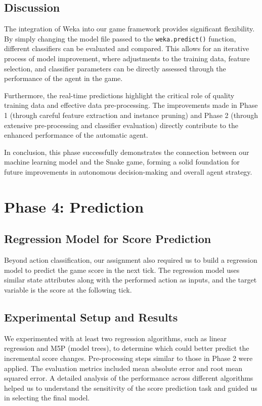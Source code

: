 \documentclass[12pt,a4paper]{article}
\begin{document}
\subsection{Discussion}

The integration of Weka into our game framework provides significant flexibility. By simply changing the model file passed to the \texttt{weka.predict()} function, different classifiers can be evaluated and compared. This allows for an iterative process of model improvement, where adjustments to the training data, feature selection, and classifier parameters can be directly assessed through the performance of the agent in the game.

Furthermore, the real-time predictions highlight the critical role of quality training data and effective data pre-processing. The improvements made in Phase 1 (through careful feature extraction and instance pruning) and Phase 2 (through extensive pre-processing and classifier evaluation) directly contribute to the enhanced performance of the automatic agent.

In conclusion, this phase successfully demonstrates the connection between our machine learning model and the Snake game, forming a solid foundation for future improvements in autonomous decision-making and overall agent strategy.



\section{Phase 4: Prediction}
\subsection{Regression Model for Score Prediction}
Beyond action classification, our assignment also required us to build a regression model to predict the game score in the next tick. The regression model uses similar state attributes along with the performed action as inputs, and the target variable is the score at the following tick.

\subsection{Experimental Setup and Results}
We experimented with at least two regression algorithms, such as linear regression and M5P (model trees), to determine which could better predict the incremental score changes. Pre-processing steps similar to those in Phase 2 were applied. The evaluation metrics included mean absolute error and root mean squared error. A detailed analysis of the performance across different algorithms helped us to understand the sensitivity of the score prediction task and guided us in selecting the final model.
\end{document}
